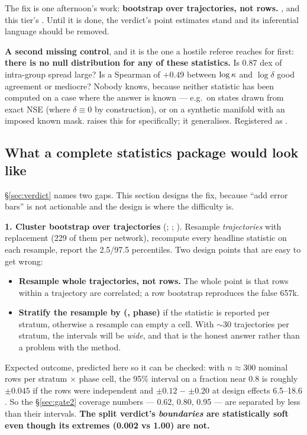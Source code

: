 The fix is one afternoon's work: \textbf{bootstrap over trajectories, not
rows.} , and this tier's . Until it is done, the
verdict's point estimates stand and its inferential language should be removed.

\textbf{A second missing control}, and it is the one a hostile referee reaches
for first: \textbf{there is no null distribution for any of these statistics.}
Is 0.87 dex of intra-group \rQSE{} spread large? Is a Spearman of $+0.49$
between $\log\kappa$ and $\log\delta$ good agreement or mediocre? Nobody knows,
because neither statistic has been computed on a case where the answer is known
--- e.g.\ on states drawn from exact NSE (where $\delta \equiv 0$ by
construction), or on a synthetic manifold with an imposed known mask.
 raises this for \rQSE{} specifically; it generalises.
Registered as .

\subsection{What a complete statistics package would look like}
\label{sec:statspackage}

\S\ref{sec:verdict} names two gaps. This section designs the fix, because ``add
error bars'' is not actionable and the design is where the difficulty is.

\textbf{1. Cluster bootstrap over trajectories} (\citealt[\S 3.8]{davison1997};
\citealt{field2007}; \citealt{cameron2015}). Resample \emph{trajectories} with
replacement (229 of them per network), recompute every headline statistic on
each resample, report the 2.5/97.5 percentiles. Two design points that are easy
to get wrong:

\begin{itemize}
\item \textbf{Resample whole trajectories, not rows.} The whole point is that
  rows within a trajectory are correlated; a row bootstrap reproduces the false
  657k.
\item \textbf{Stratify the resample by (\Tn, phase)} if the statistic is
  reported per stratum, otherwise a resample can empty a cell. With ${\sim}30$
  trajectories per stratum, the intervals will be \emph{wide}, and that is the
  honest answer rather than a problem with the method.
\end{itemize}

Expected outcome, predicted here so it can be checked: with $n \approx 300$
nominal rows per stratum $\times$ phase cell, the 95\% interval on a fraction
near 0.8 is roughly $\pm 0.045$ if the rows were independent and
\textbf{$\pm 0.12$ -- $\pm 0.20$} at design effects 6.5--18.6
. So the
\S\ref{sec:gate2} coverage numbers --- 0.62, 0.80, 0.95 --- are separated by
less than their intervals. \textbf{The split verdict's \emph{boundaries} are
statistically soft even though its extremes (0.002 vs 1.00) are not.}

